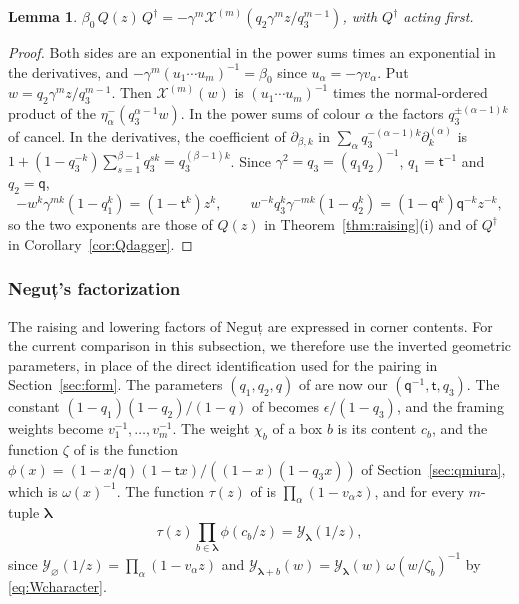 \documentclass[11pt]{amsart}
\newtheorem{lemma}[theorem]{Lemma}
\theoremstyle{definition}
\theoremstyle{remark}
\newcommand{\Mq}{\mathsf q}                      %
\newcommand{\Mt}{\mathsf t}                      %
\newcommand{\betaz}{\beta_0}                     %
\newcommand{\bl}{{\boldsymbol{\lambda}}}         %
\newcommand{\bwt}[1]{\zeta_{#1}}                 %
\newcommand{\CY}{\mathcal Y}
\newcommand{\Yfn}[1]{\CY_{#1}}                   %
\newcommand{\ceig}[1]{c_{#1}}                    %
\newcommand{\Xk}[1]{\mathcal X^{(#1)}}           %
\newcommand{\Qcr}{Q}                             %
\newcommand{\Qan}{Q^\dagger}                     %
\newcommand{\Negut}{Neguț}
\begin{document}
\begin{lemma}\label{lem:corner}
\(\betaz\,\Qcr(z)\,\Qan=-\gamma^m\Xk{m}(q_2\gamma^mz/q_3^{m-1})\), with \(\Qan\) acting first.
\end{lemma}

\begin{proof}
Both sides are an exponential in the power sums times an exponential in the
derivatives, and \(-\gamma^m(u_1\cdots u_m)^{-1}=\betaz\) since \(u_\alpha=-\gamma v_\alpha\). Put
\(w=q_2\gamma^mz/q_3^{m-1}\). Then \(\Xk{m}(w)\) is \((u_1\cdots u_m)^{-1}\) times
the normal-ordered product of the \(\eta^-_\alpha(q_3^{\alpha-1}w)\). In the power sums of colour
\(\alpha\) the factors \(q_3^{\pm(\alpha-1)k}\) of \cite[(2.52)]{BCS} cancel. In the derivatives,
the coefficient of \(\partial_{\beta,k}\) in \(\sum_\alpha q_3^{-(\alpha-1)k}\partial^{(\alpha)}_k\) is
\(1+(1-q_3^{-k})\sum_{s=1}^{\beta-1}q_3^{sk}=q_3^{(\beta-1)k}\). Since \(\gamma^2=q_3=(q_1q_2)^{-1}\),
\(q_1=\Mt^{-1}\) and \(q_2=\Mq\),
\[
 -w^k\gamma^{mk}(1-q_1^k)=(1-\Mt^k)z^k,\qquad
 w^{-k}q_3^k\gamma^{-mk}(1-q_2^k)=(1-\Mq^k)\Mq^{-k}z^{-k},
\]
so the two exponents are those of \(\Qcr(z)\) in Theorem~\ref{thm:raising}(i) and of
\(\Qan\) in Corollary~\ref{cor:Qdagger}.
\end{proof}

\subsubsection{\Negut's factorization}\label{sec:negut}

The raising and lowering factors of \Negut{} \cite[Theorem~1.2]{N3} are expressed
in corner contents. For the current comparison in this subsection, we therefore
use the inverted geometric parameters, in place of the direct identification
used for the pairing in Section~\ref{sec:form}.
The parameters \((q_1,q_2,q)\) of \cite{N3} are now our \((\Mq^{-1},\Mt,q_3)\).
The constant \((1-q_1)(1-q_2)/(1-q)\) of \cite{N3} becomes
\(\epsilon/(1-q_3)\), and the framing weights become
\(v_1^{-1},\dots,v_m^{-1}\). The weight \(\chi_b\) of a box \(b\) \cite[(3.5)]{N3} is its content
\(\ceig{b}\), and the function \(\zeta\) of \cite[(2.1)]{N3} is the function
\(\phi(x)=(1-x/\Mq)(1-\Mt x)/((1-x)(1-q_3x))\) of Section~\ref{sec:qmiura}, which is
\(\omega(x)^{-1}\). The function \(\tau(z)\) of \cite[(3.8)]{N3} is \(\prod_\alpha(1-v_\alpha z)\), and
for every \(m\)-tuple \(\bl\)
\begin{equation}\label{eq:negutY}
 \tau(z)\prod_{b\in\bl}\phi(\ceig{b}/z)=\Yfn{\bl}(1/z),
\end{equation}
since \(\Yfn{\varnothing}(1/z)=\prod_\alpha(1-v_\alpha z)\) and
\(\Yfn{\bl+b}(w)=\Yfn{\bl}(w)\,\omega(w/\bwt{b})^{-1}\) by \eqref{eq:Wcharacter}.
\end{document}
